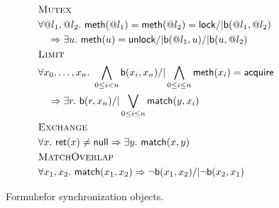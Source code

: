 \begin{figure}
  \footnotesize
  \begin{align*}
    & \textsc{Mutex} \\
    & \forall @l_1, @l_2.\ {\sf meth}(@l_1) = {\sf meth}(@l_2) = {\sf lock} /| {\sf b}(@l_1,@l_2) \\
    & \quad => \exists u.\ {\sf meth}(u) = {\sf unlock} /| {\sf b}(@l_1,u) /| {\sf b}(u,@l_2)
    \\
    & \textsc{Limit} \\
    & \forall x_0,\dots,x_n.\ \bigwedge_{0 \leq i < n} {\sf b}(x_i,x_n) /| \bigwedge_{0 \leq i \leq n} {\sf meth}(x_i) = {\sf acquire} \\
    & \quad=> \exists r.\ {\sf b}(r,x_n) /| \bigvee_{0 \leq i \leq n} {\sf match}(y,x_i)
    \\
    & \textsc{Exchange} \\
    & \forall x.\ {\sf ret}(x) \neq {\sf null} =>  \exists y.\ {\sf match}(x,y)  \\
    & \textsc{MatchOverlap} \\
    & \forall x_1,x_2.\ {\sf match}(x_1,x_2) => \neg {\sf b}(x_1,x_2) /| \neg {\sf b}(x_2,x_1) 
  \end{align*}
  \caption{Formul\ae for synchronization objects.}
  \label{fig:formulas:synchronization}
\end{figure}




%
%
%


